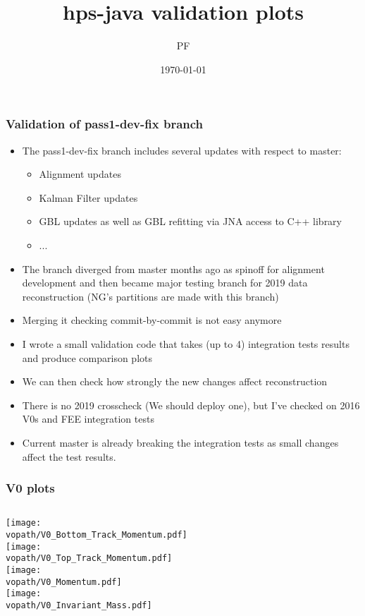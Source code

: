 \documentclass{beamer}
\title[Short title]{hps-java validation plots} %
\author{PF} %
\institute[SLAC] %
{
SLAC \\ %
\medskip
\textit{} %
}
\date{\today} %
\newcommand{\vopath}{/Users/pbutti/sw/hps-java-validation/analysis/v0_2016_validation}
\begin{document}
\begin{frame}
\titlepage %
\end{frame}

\begin{frame}
\frametitle{Validation of pass1-dev-fix branch}
\begin{small}
\begin{itemize}
\item{The pass1-dev-fix branch includes several updates with respect to master:
\begin{itemize}
\item{Alignment updates}
\item{Kalman Filter updates}
\item{GBL updates as well as GBL refitting via JNA access to C++ library}
\item{...}
\end{itemize}
}
\item {The branch diverged from master months ago as spinoff for alignment development and then became major testing branch for 2019 data reconstruction (NG's partitions are made with this branch)}
\item {Merging it checking commit-by-commit is not easy anymore}
\item {I wrote a small validation code that takes (up to 4) integration tests results and produce comparison plots}
\item {We can then check how strongly the new changes affect reconstruction}
\item {There is no 2019 crosscheck (We should deploy one), but I've checked on 2016 V0s and FEE integration tests}
\item {Current master is already breaking the integration tests as small changes affect the test results.}
\end{itemize}
\end{small}
\end{frame}

\begin{frame}
\frametitle{V0 plots}
\begin{columns}[c]
\texttt{[image: \\vopath/V0\_Bottom\_Track\_Momentum.pdf]}\\
\texttt{[image: \\vopath/V0\_Top\_Track\_Momentum.pdf]}\\
\texttt{[image: \\vopath/V0\_Momentum.pdf]}\\
\texttt{[image: \\vopath/V0\_Invariant\_Mass.pdf]}\\
\end{columns}
\end{frame}
\end{document}

